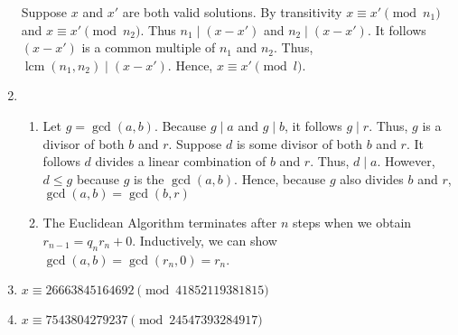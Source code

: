 \documentclass[10pt]{article}
\DeclareMathOperator*{\lcm}{lcm}
\begin{document}
\begin{enumerate}[label= \arabic*.]
    Suppose $x$ and $x'$ are both valid solutions. 
    By transitivity $x\equiv x'\pmod{n_1}$ and $x\equiv x'\pmod{n_2}$.
    Thus $n_1\mid (x-x')$ and $n_2\mid (x-x')$. 
    It follows $(x-x')$ is a common multiple of $n_1$ and $n_2$.
    Thus, $\lcm(n_1,n_2)\mid (x-x')$. Hence, $x\equiv x'\pmod{l}$.
    \item \begin{enumerate}
        \item Let $g=\gcd(a,b)$. Because $g\mid a$ and $g\mid b$, it follows $g\mid r$. 
        Thus, $g$ is a divisor of both $b$ and $r$.
        Suppose $d$ is some divisor of both $b$ and $r$.
        It follows $d$ divides a linear combination of $b$ and $r$.
        Thus, $d\mid a$.
        However, $d\le g$ because $g$ is the $\gcd(a,b)$.
        Hence, because $g$ also divides $b$ and $r$, $\gcd(a,b)=\gcd(b,r)$
        \item The Euclidean Algorithm terminates after $n$ steps when we obtain $r_{n-1}=q_n r_n+0$. 
        Inductively, we can show $\gcd(a,b)=\gcd(r_n,0)=r_n$.
    \end{enumerate}
    \item $x\equiv 26663845164692\pmod{41852119381815}$
    \item $x\equiv 7543804279237\pmod{24547393284917}$
\end{enumerate}

\end{document}
